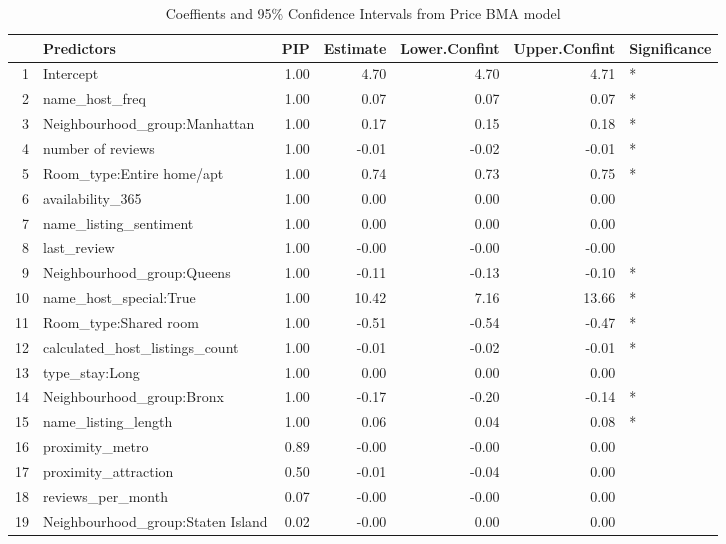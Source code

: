 \documentclass[10pt]{jmlr}%
\begin{document}
\begin{table}[ht]
\centering
\begin{tabular}{rlrrrrl}
  \hline
 & Predictors & PIP & Estimate & Lower.Confint & Upper.Confint & Significance \\ 
  \hline
1 & Intercept & 1.00 & 4.70 & 4.70 & 4.71 & * \\ 
  2 & name\_host\_freq & 1.00 & 0.07 & 0.07 & 0.07 & * \\ 
  3 & Neighbourhood\_group:Manhattan & 1.00 & 0.17 & 0.15 & 0.18 & * \\ 
  4 & number of reviews & 1.00 & -0.01 & -0.02 & -0.01 & * \\ 
  5 & Room\_type:Entire home/apt & 1.00 & 0.74 & 0.73 & 0.75 & * \\ 
  6 & availability\_365 & 1.00 & 0.00 & 0.00 & 0.00 &  \\ 
  7 & name\_listing\_sentiment & 1.00 & 0.00 & 0.00 & 0.00 &  \\ 
  8 & last\_review & 1.00 & -0.00 & -0.00 & -0.00 &  \\ 
  9 & Neighbourhood\_group:Queens & 1.00 & -0.11 & -0.13 & -0.10 & * \\ 
  10 & name\_host\_special:True & 1.00 & 10.42 & 7.16 & 13.66 & * \\ 
  11 & Room\_type:Shared room & 1.00 & -0.51 & -0.54 & -0.47 & * \\ 
  12 & calculated\_host\_listings\_count & 1.00 & -0.01 & -0.02 & -0.01 & * \\ 
  13 & type\_stay:Long & 1.00 & 0.00 & 0.00 & 0.00 &  \\ 
  14 & Neighbourhood\_group:Bronx & 1.00 & -0.17 & -0.20 & -0.14 & * \\ 
  15 & name\_listing\_length & 1.00 & 0.06 & 0.04 & 0.08 & * \\ 
  16 & proximity\_metro & 0.89 & -0.00 & -0.00 & 0.00 &  \\ 
  17 & proximity\_attraction & 0.50 & -0.01 & -0.04 & 0.00 &  \\ 
  18 & reviews\_per\_month & 0.07 & -0.00 & -0.00 & 0.00 &  \\ 
  19 & Neighbourhood\_group:Staten Island & 0.02 & -0.00 & 0.00 & 0.00 &  \\ 
   \hline
\end{tabular}
\caption{Coeffients and 95\% Confidence Intervals from Price BMA model} 
\end{table}
\end{document}
